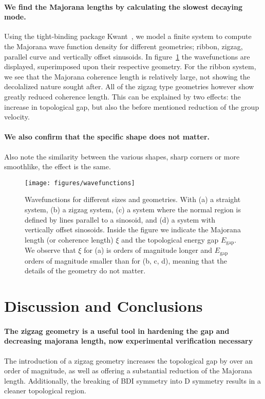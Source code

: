 \documentclass[english, twocolumn, 10pt, aps, superscriptaddress, floatfix, prb, citeautoscript]{revtex4-1}
\renewcommand{\comment}[2]{#2}
\renewcommand{\comment}{\paragraph}
\begin{document}
\comment{We find the Majorana lengths by calculating the slowest decaying mode.}
Using the tight-binding package Kwant~\cite{groth_kwant:_2014}, we model a finite system to compute the Majorana wave function density for different geometries; ribbon, zigzag, parallel curve and vertically offset sinusoids.
In figure~\ref{fig:wavefunctions} the wavefunctions are displayed, superimposed upon their respective geometry.
For the ribbon system, we see that the Majorana coherence length is relatively large, not showing the decolalized nature sought after.
All of the zigzag type geometries however show greatly reduced coherence length.
This can be explained by two effects: the increase in topological gap, but also the before mentioned reduction of the group velocity.

\comment{We also confirm that the specific shape does not matter.}
Also note the similarity between the various shapes, sharp corners or more smoothlike, the effect is the same.

\begin{figure}[!htb]
\texttt{[image: figures/wavefunctions]}
\caption{Wavefunctions for different sizes and geometries.
With (a) a straight system, (b) a zigzag system, (c) a system where the normal region is defined by lines parallel to a sinosoid, and (d) a system with vertically offset sinosoids.
Inside the figure we indicate the Majorana length (or coherence length) $\xi$ and the topological energy gap $E_\textrm{gap}.$
We observe that $\xi$ for (a) is orders of magnitude longer and $E_\textrm{gap}$ orders of magnitude smaller than for (b, c, d), meaning that the details of the geometry do not matter.
\label{fig:wavefunctions}}
\end{figure}

\section{Discussion and Conclusions}

\comment{The zigzag geometry is a useful tool in hardening the gap and decreasing majorana length, now experimental verification necessary}
The introduction of a zigzag geometry increases the topological gap by over an order of magnitude, as well as offering a substantial reduction of the Majorana length.
Additionally, the breaking of BDI symmetry into D symmetry results in a cleaner topological region.
\end{document}
